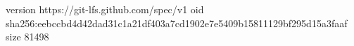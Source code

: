 version https://git-lfs.github.com/spec/v1
oid sha256:eebccbd4d42dad31c1a21df403a7cd1902e7e5409b15811129bf295d15a3faaf
size 81498
